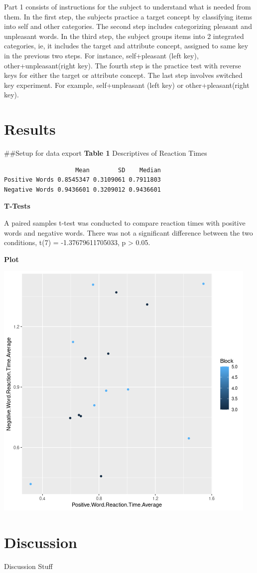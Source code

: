 \documentclass[11pt]{article}
\begin{document}
Part 1 consists of instructions for the subject to understand what is needed from them. In the first step, the subjects practice a target concept by classifying items into self and other categories. The second step includes categorizing pleasant and unpleasant words. In the third step, the subject groups items into 2 integrated categories, ie, it includes the target and attribute concept, assigned to same key in the previous two steps. For instance, self+pleasant (left key), other+unpleasant(right key). The fourth step is the practice test with reverse keys for either the target or attribute concept. The last step involves switched key experiment. For example, self+unpleasant (left key) or other+pleasant(right key). 

\section{Results}
\label{sec:org527b981}

\#\#Setup for data export
\textbf{Table 1}
Descriptives of Reaction Times 
\begin{verbatim}
                    Mean        SD    Median
Positive Words 0.8545347 0.3109061 0.7911803
Negative Words 0.9436601 0.3209012 0.9436601
\end{verbatim}


\textbf{T-Tests}

A paired samples t-test was conducted to compare reaction times with positive words and negative words. There was not a significant difference between the two conditions, t(7) =  -1.37679611705033, p > 0.05.  

\textbf{Plot}
\begin{center}
\includegraphics[width=.9\linewidth]{plot.png}
\end{center}

\section{Discussion}
\label{sec:org6df76ac}

Discussion Stuff







\end{document}
